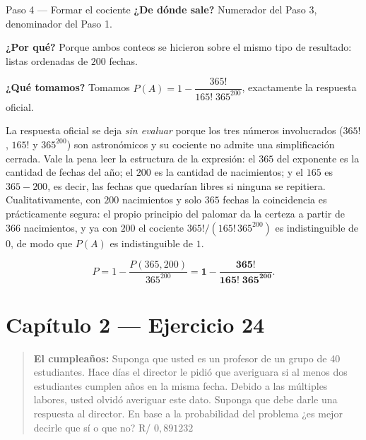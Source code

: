 \documentclass[11pt]{article}
\begin{document}
\begin{sol}
\begin{paso}{Paso 4 --- Formar el cociente}
\textbf{¿De d\'onde sale?} Numerador del Paso 3, denominador del Paso 1.

\textbf{¿Por qu\'e?} Porque ambos conteos se hicieron sobre el mismo tipo de resultado: listas ordenadas de $200$ fechas.

\textbf{¿Qu\'e tomamos?} Tomamos $P(A)=1-\dfrac{365!}{165!\;365^{200}}$, exactamente la respuesta oficial.
\end{paso}

\begin{nota}
La respuesta oficial se deja \emph{sin evaluar} porque los tres n\'umeros involucrados ($365!$, $165!$ y $365^{200}$) son astron\'omicos y su cociente no admite una simplificaci\'on cerrada. Vale la pena leer la estructura de la expresi\'on: el $365$ del exponente es la cantidad de fechas del a\~no; el $200$ es la cantidad de nacimientos; y el $165$ es $365-200$, es decir, las fechas que quedar\'ian libres si ninguna se repitiera. Cualitativamente, con $200$ nacimientos y solo $365$ fechas la coincidencia es pr\'acticamente segura: el propio principio del palomar da la certeza a partir de $366$ nacimientos, y ya con $200$ el cociente $365!/(165!\,365^{200})$ es indistinguible de $0$, de modo que $P(A)$ es indistinguible de $1$.
\end{nota}

\end{sol}

\begin{resp}
\[
P=1-\frac{P(365,200)}{365^{200}}=\mathbf{1-\frac{365!}{165!\;365^{200}}} .
\]
\end{resp}

\section*{Cap\'itulo 2 --- Ejercicio 24}

\begin{quote}
\textbf{El cumplea\~nos:} Suponga que usted es un profesor de un grupo de 40 estudiantes. Hace d\'ias el director le pidi\'o que averiguara si al menos dos estudiantes cumplen a\~nos en la misma fecha. Debido a las m\'ultiples labores, usted olvid\'o averiguar este dato. Suponga que debe darle una respuesta al director. En base a la probabilidad del problema ¿es mejor decirle que s\'i o que no? \hfill R/ $0{,}891232$
\end{quote}
\end{document}
